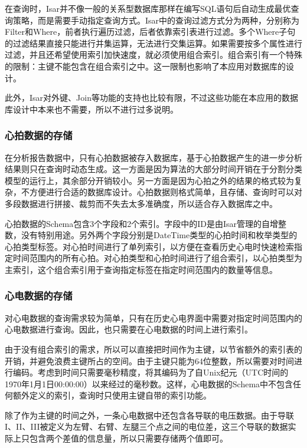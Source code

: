 在查询时，Isar并不像一般的关系型数据库那样在编写SQL语句后自动生成最优查询策略，而是需要手动指定查询方式。Isar中的查询过滤方式分为两种，分别称为Filter和Where，前者执行遍历过滤，后者依靠索引表进行过滤。多个Where子句的过滤结果直接只能进行并集运算，无法进行交集运算。如果需要按多个属性进行过滤，并且还希望使用索引加快速度，就必须使用组合索引。组合索引有一个特殊的限制：主键不能包含在组合索引之中。这一限制也影响了本应用对数据库的设计。

此外，Isar对外键、Join等功能的支持也比较有限，不过这些功能在本应用的数据库设计中本来也不需要，所以不进行过多说明。

\subsubsection{心拍数据的存储}\label{subsubsec:beat-storage}

在分析报告数据中，只有心拍数据被存入数据库，基于心拍数据产生的进一步分析结果则只在查询时动态生成。这一方面是因为算法的大部分时间开销在于分割分类模型的运行上，其余部分开销较小。另一方面是因为心拍之外的结果的格式较为复杂，不方便进行合适的数据库设计。心拍数据则格式简单，且存储、查询时可以对多段数据进行拼接、裁剪而不失去太多准确度，所以适合存入数据库之中。

心拍数据的Schema包含3个字段和2个索引。字段中的ID是由Isar管理的自增整数，没有特别用途。另外两个字段分别是DateTime类型的心拍时间和枚举类型的心拍类型标签。对心拍时间进行了单列索引，以方便在查看历史心电时快速检索指定时间范围内的所有心拍。对心拍类型和心拍时间进行了组合索引，以心拍类型为主索引，这个组合索引用于查询指定标签在指定时间范围内的数量等信息。

\subsubsection{心电数据的存储}\label{subsubsec:point-storage}

对心电数据的查询需求较为简单，只有在历史心电界面中需要对指定时间范围内的心电数据进行查询。因此，也只需要在心电数据的时间上进行索引。

由于没有组合索引的需求，所以可以直接把时间作为主键，以节省额外的索引表的开销，并避免浪费主键所占的空间。由于主键只能为64位整数，所以需要对时间进行编码。考虑到时间只需要毫秒精度，将其编码为了自Unix纪元（UTC时间的1970年1月1日00:00:00）以来经过的毫秒数。这样，心电数据的Schema中不包含任何额外定义的索引，查询时只使用主键自带的索引功能。

除了作为主键的时间之外，一条心电数据中还包含各导联的电压数据。由于导联I、II、III被定义为左臂、右臂、左腿三个点之间的电位差，这三个导联的数据实际上只包含两个差值的信息量，所以只需要存储两个值即可。
